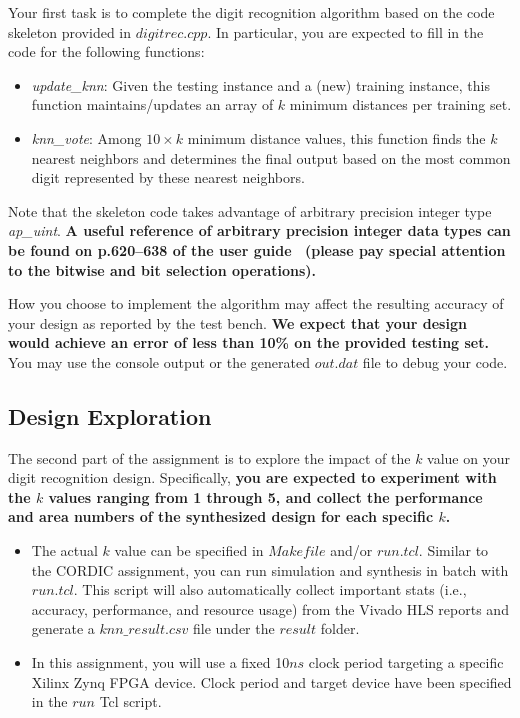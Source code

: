 \documentclass[paper=letter, fontsize=10pt]{scrartcl} %
\numberwithin{equation}{section} %
\numberwithin{figure}{section} %
\numberwithin{table}{section} %
\begin{document}
Your first task is to complete the digit recognition algorithm based on the code skeleton provided in $digitrec.cpp$. 
In particular, you are expected to fill in the code for the following functions:
\begin{itemize}
\item \textit{update\_knn}: Given the testing instance and a (new) training instance, this function maintains/updates an array of $k$ minimum distances per training set.
\item \textit{knn\_vote}: Among $10 \times k$ minimum distance values, this function finds the $k$ nearest neighbors and determines the final output based on the most common digit represented by these nearest neighbors.
\end{itemize}

Note that the skeleton code takes advantage of arbitrary precision integer type \textit{ap\_uint}. \textbf{A useful reference of arbitrary precision integer data types can be found on p.620--638 of the user guide~\cite{ug902} (please pay special attention to the bitwise and bit selection operations).}

How you choose to implement the algorithm may affect the resulting accuracy of your design as reported by the test bench. \textbf{We expect that your design would achieve an error of less than 10\% on the provided testing set.} You may use the console output or the generated $out.dat$ file to debug your code.

\subsection{Design Exploration}
\label{design-expl}
The second part of the assignment is to explore the impact of the $k$ value on your digit recognition design. Specifically, \textbf{you are expected to experiment with the $k$ values ranging from 1 through 5, and collect the performance and area numbers of the synthesized design for each specific $k$.} 

\begin{itemize}
    \item The actual $k$ value can be specified in $Makefile$ and/or $run.tcl$. Similar to the CORDIC assignment, you can run simulation and synthesis in batch with $run.tcl$. This script will also automatically collect important stats (i.e., accuracy, performance, and resource usage) from the Vivado HLS reports and generate a $knn\_result.csv$ file under the $result$ folder.

    \item In this assignment, you will use a fixed 10$ns$ clock period targeting a specific Xilinx Zynq FPGA device. Clock period and target device have been specified in the $run$ Tcl script.     
\end{itemize}
\end{document}
